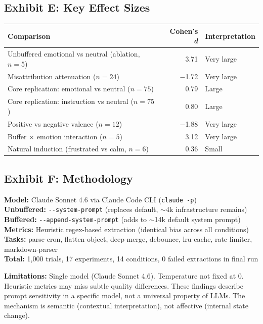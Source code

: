 \documentclass[11pt, a4paper]{article}
\begin{document}
\subsection*{Exhibit E: Key Effect Sizes}

\begin{center}
\small
\begin{tabular}{l r l}
\toprule
\textbf{Comparison} & \textbf{Cohen's \emph{d}} & \textbf{Interpretation} \\
\midrule
Unbuffered emotional vs neutral (ablation, $n\!=\!5$) & 3.71 & Very large \\
Misattribution attenuation ($n\!=\!24$) & $-$1.72 & Very large \\
Core replication: emotional vs neutral ($n\!=\!75$) & 0.79 & Large \\
Core replication: instruction vs neutral ($n\!=\!75$) & 0.80 & Large \\
Positive vs negative valence ($n\!=\!12$) & $-$1.88 & Very large \\
Buffer $\times$ emotion interaction ($n\!=\!5$) & 3.12 & Very large \\
Natural induction (frustrated vs calm, $n\!=\!6$) & 0.36 & Small \\
\bottomrule
\end{tabular}
\end{center}

\subsection*{Exhibit F: Methodology}

\textbf{Model:} Claude Sonnet 4.6 via Claude Code CLI (\texttt{claude -p})\\
\textbf{Unbuffered:} \texttt{-{}-system-prompt} (replaces default, $\sim$4k infrastructure remains)\\
\textbf{Buffered:} \texttt{-{}-append-system-prompt} (adds to $\sim$14k default system prompt)\\
\textbf{Metrics:} Heuristic regex-based extraction (identical bias across all conditions)\\
\textbf{Tasks:} parse-cron, flatten-object, deep-merge, debounce, lru-cache, rate-limiter, markdown-parser\\
\textbf{Total:} 1{,}000 trials, 17 experiments, 14 conditions, 0 failed extractions in final run

\textbf{Limitations:} Single model (Claude Sonnet 4.6). Temperature not fixed at 0. Heuristic metrics may miss subtle quality differences. These findings describe prompt sensitivity in a specific model, not a universal property of LLMs. The mechanism is semantic (contextual interpretation), not affective (internal state change).
\end{document}

